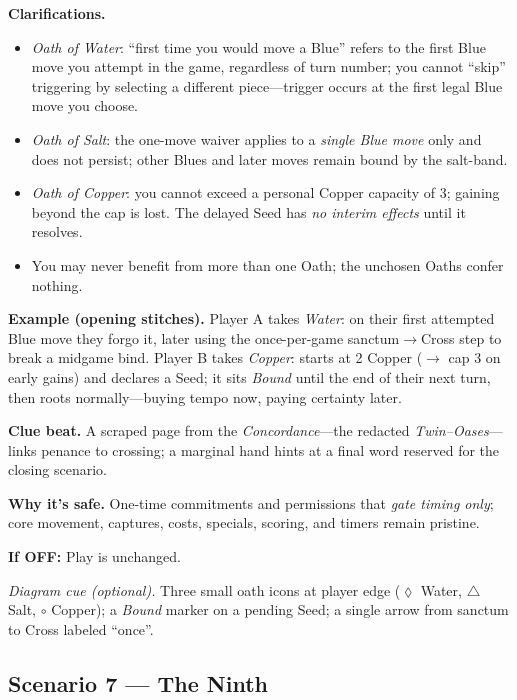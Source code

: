\documentclass[11pt]{article}
\numberwithin{equation}{section} %
\theoremstyle{plain} %
\theoremstyle{definition} %
\theoremstyle{remark} %
\begin{document}
\medskip
\noindent\textbf{Clarifications.}
\begin{itemize}\setlength\itemsep{0.25em}
  \item \textit{Oath of Water}: “first time you would move a Blue” refers to the first Blue move you attempt in the game, regardless of turn number; you cannot “skip” triggering by selecting a different piece—trigger occurs at the first legal Blue move you choose.
  \item \textit{Oath of Salt}: the one-move waiver applies to a \emph{single Blue move} only and does not persist; other Blues and later moves remain bound by the salt-band.
  \item \textit{Oath of Copper}: you cannot exceed a personal Copper capacity of 3; gaining beyond the cap is lost. The delayed Seed has \emph{no interim effects} until it resolves.
  \item You may never benefit from more than one Oath; the unchosen Oaths confer nothing.
\end{itemize}

\medskip
\noindent\textbf{Example (opening stitches).}  
Player A takes \textit{Water}: on their first attempted Blue move they forgo it, later using the once-per-game sanctum\(\to\)Cross step to break a midgame bind.  
Player B takes \textit{Copper}: starts at 2 Copper (\( \to \) cap 3 on early gains) and declares a Seed; it sits \emph{Bound} until the end of their next turn, then roots normally—buying tempo now, paying certainty later.

\medskip
\noindent\textbf{Clue beat.} A scraped page from the \emph{Concordance}—the redacted \emph{Twin–Oases}—links penance to crossing; a marginal hand hints at a final word reserved for the closing scenario.

\medskip
\noindent\textbf{Why it’s safe.} One-time commitments and permissions that \emph{gate timing only}; core movement, captures, costs, specials, scoring, and timers remain pristine.

\medskip
\noindent\textbf{If \textsc{OFF}:} Play is unchanged.

\medskip
\noindent\textit{Diagram cue (optional).} Three small oath icons at player edge (\(\lozenge\) Water, \(\triangle\) Salt, \(\circ\) Copper); a \emph{Bound} marker on a pending Seed; a single arrow from sanctum to Cross labeled “once”.

\subsection{Scenario 7 — The Ninth}
\label{scen:the-ninth}
\end{document}
